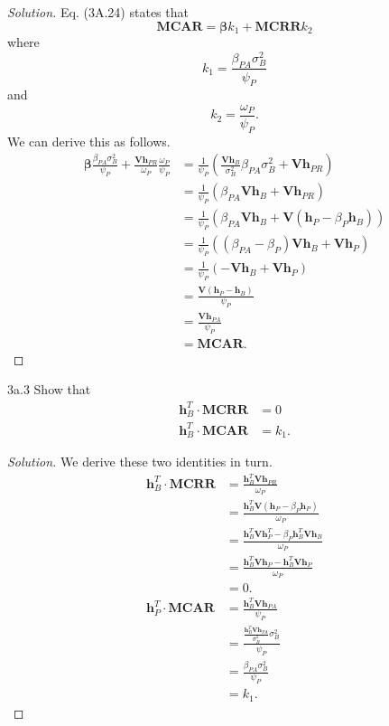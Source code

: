 \begin{proof}[Solution]
Eq. (3A.24) states that \[\mathbf{MCAR} = \bm{\beta}k_{1} + \mathbf{MCRR}k_{2}\] where \[k_{1} = \frac{\beta_{PA}\sigma_{B}^{2}}{\psi_{P}}\] and \[k_{2} = \frac{\omega_{P}}{\psi_{P}}.\] We can derive this as follows.
\begin{align*}
\bm{\beta}\frac{\beta_{PA}\sigma_{B}^{2}}{\psi_{P}} + \frac{\mathbf{V}\mathbf{h}_{PR}}{\omega_{P}}\frac{\omega_{P}}{\psi_{P}} &= \frac{1}{\psi_{P}}\left( \frac{\mathbf{V}\mathbf{h}_{B}}{\sigma_{B}^{2}}\beta_{PA}\sigma_{B}^{2} + \mathbf{V}\mathbf{h}_{PR} \right)\\
&= \frac{1}{\psi_{P}} (\beta_{PA}\mathbf{V}\mathbf{h}_{B} + \mathbf{V}\mathbf{h}_{PR})\\
&= \frac{1}{\psi_{P}}(\beta_{PA}\mathbf{V}\mathbf{h}_{B} + \mathbf{V}(\mathbf{h}_{P} - \beta_{P}\mathbf{h}_{B}))\\
&= \frac{1}{\psi_{P}}((\beta_{PA} - \beta_{P})\mathbf{V}\mathbf{h}_{B} + \mathbf{V}\mathbf{h}_{P})\\
&= \frac{1}{\psi_{P}}(-\mathbf{V}\mathbf{h}_{B} + \mathbf{V}\mathbf{h}_{P})\\
&= \frac{\mathbf{V}(\mathbf{h}_{P} - \mathbf{h}_{B})}{\psi_{P}}\\
&= \frac{\mathbf{V}\mathbf{h}_{PA}}{\psi_{P}}\\
&= \mathbf{MCAR}.
\end{align*}
\end{proof}


\begin{problem}{3a.3}
Show that
\begin{align*}
\mathbf{h}_{B}^{T} \cdot \mathbf{MCRR} &= 0 \\
\mathbf{h}_{B}^{T} \cdot \mathbf{MCAR} &= k_{1}.
\end{align*}
\end{problem}

\begin{proof}[Solution]
We derive these two identities in turn.
\begin{align*}
\mathbf{h}_{B}^{T} \cdot \mathbf{MCRR} &= \frac{\mathbf{h}_{B}^{T}\mathbf{V}\mathbf{h}_{PR}}{\omega_{P}} \\
&= \frac{\mathbf{h}_{B}^{T}\mathbf{V}(\mathbf{h}_{P} - \beta_{P}\mathbf{h}_{P})}{\omega_{P}} \\
&= \frac{\mathbf{h}_{B}^{T}\mathbf{V}\mathbf{h}_{P}^{T} - \beta_{P}\mathbf{h}_{B}^{T}\mathbf{V}\mathbf{h}_{B}}{\omega_{P}}\\
&= \frac{\mathbf{h}_{B}^{T}\mathbf{V}\mathbf{h}_{P} - \mathbf{h}_{B}^{T}\mathbf{V}\mathbf{h}_{P}}{\omega_{P}}\\
&= 0. \\
\mathbf{h}_{P}^{T} \cdot \mathbf{MCAR} &= \frac{\mathbf{h}_{B}^{T}\mathbf{V}\mathbf{h}_{PA}}{\psi_{P}}\\
&= \frac{\frac{\mathbf{h}_{B}^{T}\mathbf{V}\mathbf{h}_{PA}}{\sigma_{B}^{2}}\sigma_{B}^{2}}{\psi_{P}}\\
&= \frac{\beta_{PA}\sigma_{B}^{2}}{\psi_{P}}\\
&= k_{1}.
\end{align*}
\end{proof}


